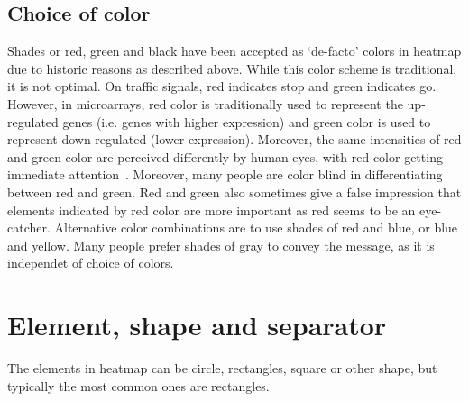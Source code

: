\documentclass[12pt, oneside, letterpaper]{article}
\begin{document}
\subsection*{Choice of color}
	Shades or red, green and black have been accepted as
	`de-facto' colors in heatmap due to historic reasons as
	described above. While this color scheme is traditional, it
	is not optimal. On traffic signals, red indicates stop and
	green indicates go. However, in microarrays, red color is
	traditionally used to represent the up-regulated genes
	(i.e. genes with higher expression) and green color is used
	to represent down-regulated (lower expression). Moreover,
	the same intensities of red and green color are perceived
	differently by human eyes, with red color getting immediate
	attention~\cite{NaturePaper}.  Moreover, many people are color
	blind in differentiating between red and green. Red and
	green also sometimes give a false impression that elements
	indicated by red color are more important as red seems to be
	an eye-catcher. Alternative color combinations are to use
	shades of red and blue, or blue and yellow. Many people
	prefer shades of gray to convey the message, as it is
	independet of choice of colors.



\section*{Element, shape and separator}
	The elements in heatmap can be circle, rectangles, square or
	other shape, but typically the most common ones are
	rectangles.
\end{document}
